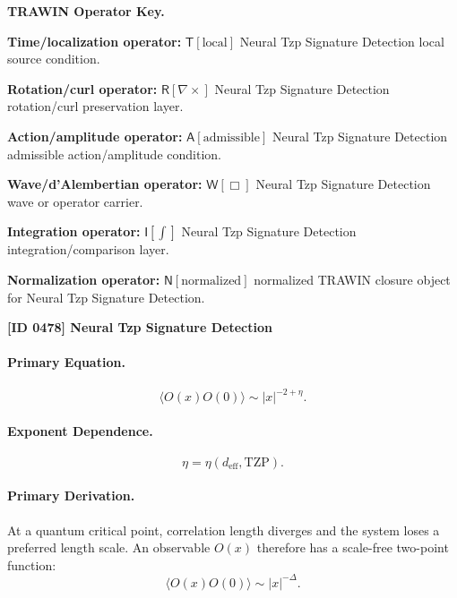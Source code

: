\par\vspace{0.45\baselineskip}
\noindent\begin{minipage}[t]{\linewidth}
\begingroup
\small
\raggedright
\textbf{TRAWIN Operator Key.}\par
\noindent\textbf{Time/localization operator:} $\mathsf{T}\!\left[\mathrm{local}\right]$ Neural Tzp Signature Detection local source condition.\par
\noindent\textbf{Rotation/curl operator:} $\mathsf{R}\!\left[\nabla\times\right]$ Neural Tzp Signature Detection rotation/curl preservation layer.\par
\noindent\textbf{Action/amplitude operator:} $\mathsf{A}\!\left[\mathrm{admissible}\right]$ Neural Tzp Signature Detection admissible action/amplitude condition.\par
\noindent\textbf{Wave/d'Alembertian operator:} $\mathsf{W}\!\left[\Box\right]$ Neural Tzp Signature Detection wave or operator carrier.\par
\noindent\textbf{Integration operator:} $\mathsf{I}\!\left[\int\right]$ Neural Tzp Signature Detection integration/comparison layer.\par
\noindent\textbf{Normalization operator:} $\mathsf{N}\!\left[\mathrm{normalized}\right]$ normalized TRAWIN closure object for Neural Tzp Signature Detection.\par
\endgroup
\end{minipage}

\clearpage
\noindent\textbf{[ID 0478] Neural Tzp Signature Detection}\par
\vspace{0.35em}
\paragraph{Primary Equation.}
\begin{equation}
\langle O(x)O(0)\rangle
\sim
|x|^{-2+\eta}.
\end{equation}

\paragraph{Exponent Dependence.}
\begin{equation}
\eta=\eta(d_{\mathrm{eff}},\mathrm{TZP}).
\end{equation}

\paragraph{Primary Derivation.}
At a quantum critical point, correlation length diverges and the system loses a preferred length scale.  
An observable $O(x)$ therefore has a scale-free two-point function:
\begin{equation}
\langle O(x)O(0)\rangle
\sim
|x|^{-\Delta}.
\end{equation}

